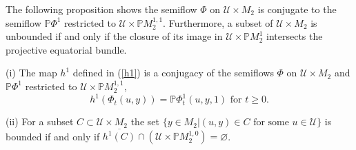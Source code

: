 \documentclass{siamltex}%
\begin{document}
The following proposition shows the semiflow $\Phi$ on $\mathcal{U}\times
M_{2}$ is conjugate to the semiflow $\mathbb{P}\Phi^{1}$ restricted to
$\mathcal{U}\times\mathbb{P}M_{2}^{1,1}$. Furthermore, a subset of
$\mathcal{U}\times M_{2}$ is unbounded if and only if the closure of its image
in $\mathcal{U}\times\mathbb{P}M_{2}^{1}$ intersects the projective equatorial bundle.

\begin{proposition}
\label{Proposition_e2}(i) The map $h^{1}$ defined in (\ref{h1}) is a conjugacy
of the semiflows $\Phi$ on $\mathcal{U}\times M_{2}$ and $\mathbb{P}\Phi^{1}$
restricted to $\mathcal{U}\times\mathbb{P}M_{2}^{1,1}$,%
\[
h^{1}(\Phi_{t}(u,y))=\mathbb{P}\Phi_{t}^{1}(u,y,1)\text{ for }t\geq0.
\]


(ii) For a subset $C\subset\mathcal{U}\times M_{2}$ the set $\{y\in
M_{2}\left\vert (u,y)\in C\text{ for some }u\in\mathcal{U}\right.  \}$ is
bounded if and only if $\overline{h^{1}(C)}\cap(\mathcal{U}\times
\mathbb{P}M_{2}^{1,0})=\varnothing$.
\end{proposition}
\end{document}
